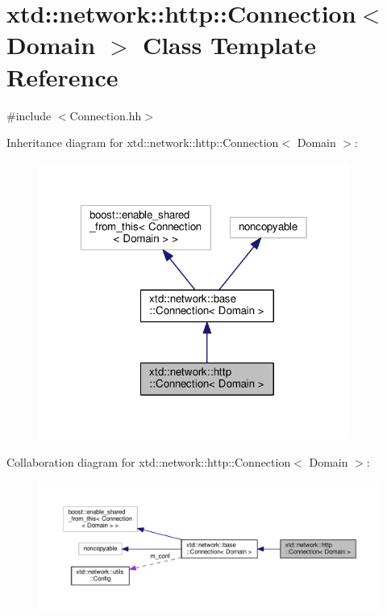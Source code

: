 \hypertarget{classxtd_1_1network_1_1http_1_1Connection}{\section{xtd\-:\-:network\-:\-:http\-:\-:Connection$<$ Domain $>$ Class Template Reference}
\label{classxtd_1_1network_1_1http_1_1Connection}
}


{\ttfamily \#include $<$Connection.\-hh$>$}



Inheritance diagram for xtd\-:\-:network\-:\-:http\-:\-:Connection$<$ Domain $>$\-:
\nopagebreak
\begin{figure}[H]
\begin{center}
\leavevmode
\includegraphics[width=289pt]{classxtd_1_1network_1_1http_1_1Connection__inherit__graph}
\end{center}
\end{figure}


Collaboration diagram for xtd\-:\-:network\-:\-:http\-:\-:Connection$<$ Domain $>$\-:
\nopagebreak
\begin{figure}[H]
\begin{center}
\leavevmode
\includegraphics[width=350pt]{classxtd_1_1network_1_1http_1_1Connection__coll__graph}
\end{center}
\end{figure}
